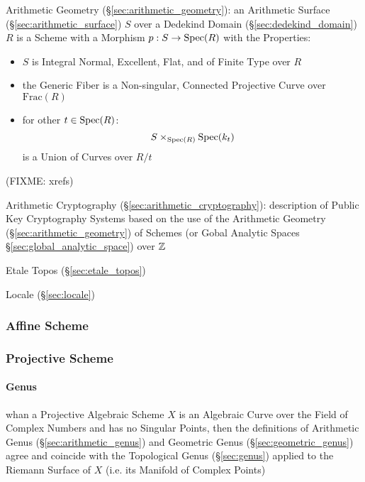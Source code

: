 \begin{itemize}
\begin{itemize}
\asterism

\fist Arithmetic Geometry (\S\ref{sec:arithmetic_geometry}): an Arithmetic
Surface (\S\ref{sec:arithmetic_surface}) $S$ over a Dedekind Domain
(\S\ref{sec:dedekind_domain}) $R$ is a Scheme with a Morphism $p : S \rightarrow
\mathrm{Spec}(R)$ with the Properties:
\begin{itemize}
  \item $S$ is Integral Normal, Excellent, Flat, and of Finite Type over $R$
  \item the Generic Fiber is a Non-singular, Connected Projective Curve over
    $\mathrm{Frac}(R)$
  \item for other $t \in \mathrm{Spec}(R)$:
    \[
      S \times_{\mathrm{Spec}(R)} \mathrm{Spec}(k_t)
    \]
    is a Union of Curves over $R / t$
\end{itemize}
(FIXME: xrefs)

\fist Arithmetic Cryptography (\S\ref{sec:arithmetic_cryptography}):
description of Public Key Cryptography Systems based on the use of the
Arithmetic Geometry (\S\ref{sec:arithmetic_geometry}) of Schemes (or Gobal
Analytic Spaces \S\ref{sec:global_analytic_space}) over $\mathbb{Z}$

Etale Topos (\S\ref{sec:etale_topos})

Locale (\S\ref{sec:locale})



\subsubsection{Affine Scheme}\label{sec:affine_scheme}

\subsubsection{Projective Scheme}\label{sec:projective_scheme}

\paragraph{Genus}\label{sec:scheme_genus}\hfill

whan a Projective Algebraic Scheme $X$ is an Algebraic Curve over the Field of
Complex Numbers and has no Singular Points, then the definitions of Arithmetic
Genus (\S\ref{sec:arithmetic_genus}) and Geometric Genus
(\S\ref{sec:geometric_genus}) agree and coincide with the Topological
Genus (\S\ref{sec:genus}) applied to the Riemann Surface of $X$ (i.e. its
Manifold of Complex Points)


\end{itemize}
\end{itemize}
